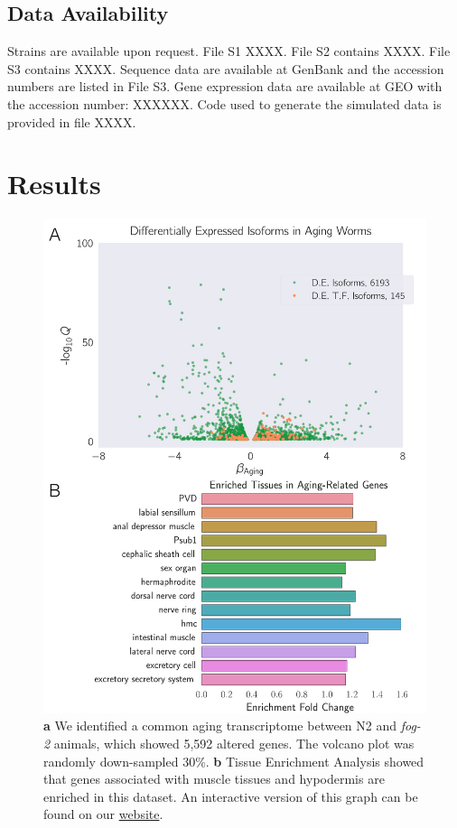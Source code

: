 \documentclass[9pt,twocolumn,twoside]{gsag3jnl}
\newcommand{\fog}{\emph{fog-2}}
\newcommand{\agen}{5,592}
\newcommand{\webref}{\href{https://wormlabcaltech.github.io/Angeles_Leighton_2016/}{website}}
\begin{document}
\subsection{Data Availability}
\label{sb:data_availability}
Strains are available upon request. File S1 XXXX. File S2 contains XXXX. File S3 contains XXXX. Sequence data are available at GenBank and the accession numbers are listed in File S3. Gene expression data are available at GEO with the accession number: XXXXXX. Code used to generate the simulated data is provided in file XXXX.

\section{Results}
\label{sec:results}
\begin{figure}[htbp]
\renewcommand{\familydefault}{\sfdefault}\normalfont{}
\centering
\includegraphics[width=\linewidth]{../output/figs/final_figs/aging_transcriptomics.pdf}
\caption{\textbf{ a} We identified a common aging transcriptome between N2 and \fog{} animals, which showed \agen{}  altered genes. The volcano plot was randomly down-sampled 30\%. \textbf{b} Tissue Enrichment Analysis showed that genes associated with muscle tissues and hypodermis are enriched in this dataset. An interactive version of this graph can be found on our \webref{}.
}%
\label{fig:agingtranscriptome}
\end{figure}
\end{document}
